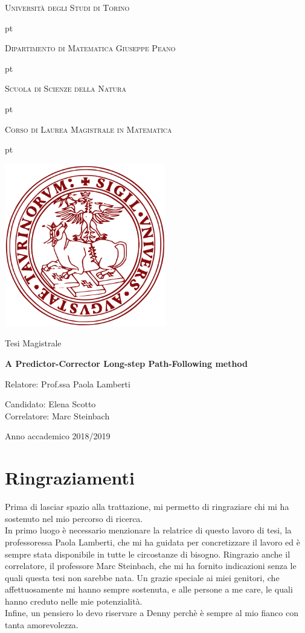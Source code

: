 \documentclass[a4paper,10 pt,titlepage,twoside]{report}
\theoremstyle{plain}
\theoremstyle{definition}
\theoremstyle{remark}
\begin{document}
\thispagestyle{empty}

\centerline {\huge{\textsc{Università degli Studi di Torino}}}
 pt

\centerline {\Large{\textsc{Dipartimento di Matematica Giuseppe Peano}}}

 pt

\centerline {\Large{\textsc{Scuola di Scienze della Natura}}}

 pt

\centerline {\Large{\textsc{Corso di Laurea Magistrale in Matematica}}}


 pt





\centerline {\includegraphics[width=7cm]{logo.jpg}}
\vskip 1.2cm
\centerline {\normalsize {Tesi Magistrale}} 

\vskip 0.7cm

\centerline {\Large {\bf A Predictor-Corrector Long-step Path-Following method}}

\vskip 1.7cm

\noindent Relatore: Prof.ssa Paola Lamberti

\hfill  {Candidato: Elena Scotto }\\
\noindent Correlatore: Marc Steinbach


\vskip 2.7cm


\centerline{Anno accademico 2018/2019}
\chapter*{Ringraziamenti}
Prima di lasciar spazio alla trattazione, mi permetto di ringraziare chi mi ha sostenuto nel mio percorso di ricerca.\\ In primo luogo è necessario menzionare la relatrice di questo lavoro di tesi, la professoressa Paola Lamberti, che mi ha guidata per concretizzare il lavoro ed è sempre stata disponibile in tutte le circostanze di bisogno. Ringrazio anche il correlatore, il professore Marc Steinbach, che mi ha fornito indicazioni senza le quali questa tesi non sarebbe nata.
Un grazie speciale ai miei genitori, che affettuosamente mi hanno sempre sostenuta, e alle persone a me care, le quali hanno creduto nelle mie potenzialità.\\ Infine, un pensiero lo devo riservare a Denny perchè è sempre al mio fianco con tanta amorevolezza.
\end{document}
